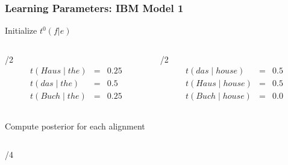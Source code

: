 \begin{frame}
\frametitle{Learning Parameters: IBM Model 1}

\begin{block}{Initialize $t^0(f|e)$}
\begin{columns}

\begin{column}{\textwidth/2}
\[
\begin{array}{ccc}
t(Haus \mid the) & = & 0.25 \\
t(das \mid the) & = & 0.5 \\
t(Buch \mid the) & = & 0.25 
\end{array}
\]

\end{column}

\begin{column}{\textwidth/2}
\[
\begin{array}{ccc}
t(das \mid house) & = & 0.5 \\
t(Haus \mid house) & = & 0.5 \\
t(Buch \mid house) & = & 0.0 
 \end{array}
\]

\end{column}

\end{columns}

\end{block}\pause

\begin{block}{Compute posterior for each alignment}

\begin{columns}[t]

\begin{column}{\textwidth/4}

\end{column}
\end{columns}
\end{block}
\end{frame}
